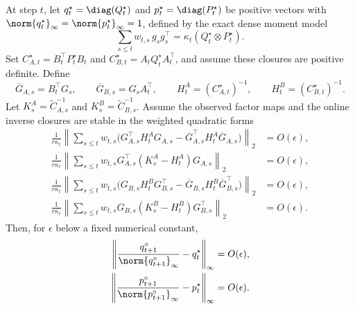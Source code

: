 \begin{proposition}
\label{prop:online-stationary-p2}
At step $t$, let
$q^\star_t=\diag(Q^\star_t)$ and
$p^\star_t=\diag(P^\star_t)$ be positive vectors with
$\norm{q^\star_t}_\infty=\norm{p^\star_t}_\infty=1$, defined by the exact
dense moment model
\[
  \sum_{s\le t}w_{t,s}\,g_sg_s^\top
  =
  \kappa_t(Q^\star_t\otimes P^\star_t).
\]
Set
$C^\star_{A,t}=B_t^\top P^\star_tB_t$ and
$C^\star_{B,t}=A_tQ^\star_tA_t^\top$, and assume these closures are
positive definite. Define
\[
  \overline G_{A,s}=B_t^\top G_s,\qquad
  \overline G_{B,s}=G_sA_t^\top,\qquad
  H^A_t=(C^\star_{A,t})^{-1},\qquad
  H^B_t=(C^\star_{B,t})^{-1}.
\]
Let $K^A_s=\widetilde C_{A,s}^{-1}$ and
$K^B_s=\widetilde C_{B,s}^{-1}$. Assume the observed factor maps and the
online inverse closures are stable in the weighted quadratic forms
\[
\begin{aligned}
  \frac{1}{r\kappa_t}
  \left\|
    \sum_{s\le t}w_{t,s}
    \bigl(
      G_{A,s}^\top H^A_tG_{A,s}
      -\overline G_{A,s}^\top H^A_t\overline G_{A,s}
    \bigr)
  \right\|_2
  &=
  O(\epsilon),
  \\
  \frac{1}{r\kappa_t}
  \left\|
    \sum_{s\le t}w_{t,s}
    G_{A,s}^\top(K^A_s-H^A_t)G_{A,s}
  \right\|_2
  &=
  O(\epsilon),
  \\
  \frac{1}{r\kappa_t}
  \left\|
    \sum_{s\le t}w_{t,s}
    \bigl(
      G_{B,s}H^B_tG_{B,s}^\top
      -\overline G_{B,s}H^B_t\overline G_{B,s}^\top
    \bigr)
  \right\|_2
  &=
  O(\epsilon),
  \\
  \frac{1}{r\kappa_t}
  \left\|
    \sum_{s\le t}w_{t,s}
    G_{B,s}(K^B_s-H^B_t)G_{B,s}^\top
  \right\|_2
  &=
  O(\epsilon).
\end{aligned}
\]
Then, for $\epsilon$ below a fixed numerical constant,
\[
\begin{aligned}
  \left\|
    \frac{q^\circ_{t+1}}{\norm{q^\circ_{t+1}}_\infty}
    -
    q^\star_t
  \right\|_\infty
  &=
  O(\epsilon),
  \\
  \left\|
    \frac{p^\circ_{t+1}}{\norm{p^\circ_{t+1}}_\infty}
    -
    p^\star_t
  \right\|_\infty
  &=
  O(\epsilon).
\end{aligned}
\]
\end{proposition}
